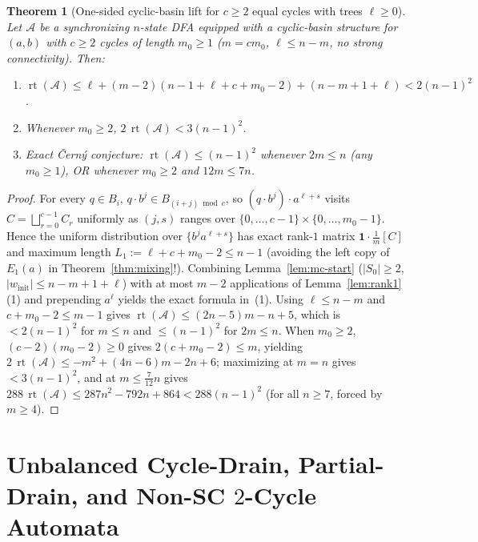 \documentclass[11pt,a4paper]{article}
\newtheorem{theorem}{Theorem}[section]
\theoremstyle{definition}
\theoremstyle{remark}
\newcommand{\rt}{\operatorname{rt}}
\newcommand{\one}{\mathbf{1}}
\newcommand{\cA}{\mathcal{A}}
\newcommand{\ind}[1]{[#1]}
\begin{document}
\begin{theorem}[One-sided cyclic-basin lift for $c \ge 2$ equal cycles with trees $\ell \ge 0$]
\label{thm:cyclic-basin}
Let $\cA$ be a synchronizing $n$-state DFA equipped with a cyclic-basin structure for $(a, b)$ with $c \ge 2$ cycles of length $m_0 \ge 1$ ($m = c m_0$, $\ell \le n - m$, no strong connectivity). Then:
\begin{enumerate}[label=(\arabic*),nosep]
  \item $\rt(\cA) \le \ell + (m - 2)(n - 1 + \ell + c + m_0 - 2) + (n - m + 1 + \ell) < 2(n - 1)^2$.
  \item Whenever $m_0 \ge 2$, $2\,\rt(\cA) < 3(n - 1)^2$.
  \item \emph{Exact \v{C}ern\'y conjecture:} $\rt(\cA) \le (n - 1)^2$ whenever $2m \le n$ (any $m_0 \ge 1$), OR whenever $m_0 \ge 2$ and $12m \le 7n$.
\end{enumerate}
\end{theorem}
\begin{proof}
For every $q \in B_i$, $q \cdot b^j \in B_{(i+j)\bmod c}$, so $(q \cdot b^j) \cdot a^{\ell + s}$ visits $C = \bigsqcup_{r=0}^{c-1} C_r$ uniformly as $(j, s)$ ranges over $\{0,\dots,c-1\} \times \{0,\dots,m_0 - 1\}$. Hence the uniform distribution over $\{b^j a^{\ell + s}\}$ has exact rank-$1$ matrix $\one \cdot \frac{1}{m}\ind{C}$ and maximum length $L_1 := \ell + c + m_0 - 2 \le n - 1$ (avoiding the left copy of $E_1(a)$ in Theorem~\ref{thm:mixing}!). Combining Lemma~\ref{lem:mc-start} ($|S_0| \ge 2$, $|w_{\mathrm{init}}| \le n - m + 1 + \ell$) with at most $m - 2$ applications of Lemma~\ref{lem:rank1}(1) and prepending $a^\ell$ yields the exact formula in~(1). Using $\ell \le n - m$ and $c + m_0 - 2 \le m - 1$ gives $\rt(\cA) \le (2n - 5)m - n + 5$, which is $< 2(n-1)^2$ for $m \le n$ and $\le (n-1)^2$ for $2m \le n$. When $m_0 \ge 2$, $(c-2)(m_0 - 2) \ge 0$ gives $2(c + m_0 - 2) \le m$, yielding $2\,\rt(\cA) \le -m^2 + (4n - 6)m - 2n + 6$; maximizing at $m = n$ gives $< 3(n-1)^2$, and at $m \le \frac{7}{12}n$ gives $288\,\rt(\cA) \le 287 n^2 - 792 n + 864 < 288(n-1)^2$ (for all $n \ge 7$, forced by $m \ge 4$).
\end{proof}

\section{Unbalanced Cycle-Drain, Partial-Drain, and Non-SC \texorpdfstring{$2$}{2}-Cycle Automata}
\label{sec:drain-nonsc}
\end{document}
